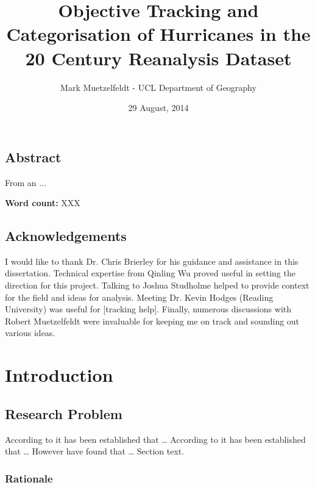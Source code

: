 \documentclass[pdftex,12pt,a4paper]{report}
\title{Objective Tracking and Categorisation of Hurricanes in the 20\ts{th} Century Reanalysis Dataset}
\author{Mark Muetzelfeldt - UCL Department of Geography}
\date{29 August, 2014}
\begin{document}


\onehalfspacing
\section*{Abstract}

From an ...

\begin{center}
\textbf{Word count:} XXX
\end{center}

\section*{Acknowledgements}

I would like to thank Dr. Chris Brierley for his guidance and assistance in this dissertation.
Technical expertise from Qinling Wu proved useful in setting the direction for this project. 
Talking to Joshua Studholme helped to provide context for the field and ideas for analysis. %
Meeting Dr. Kevin Hodges (Reading University) was useful for [tracking help]. 
Finally, numerous discussions with Robert Muetzelfeldt were invaluable for keeping me on track and sounding out various ideas.

\newpage


\tableofcontents

\chapter{Introduction}

\section{Research Problem}

According to \parencite{knappInternational2010} it has been established that \dots
According to \parencite{compoTwentieth2011} it has been established that \dots
However \textcite{walshObjective1997} have found that \dots
Section text.

\subsection{Rationale}
\end{document}
